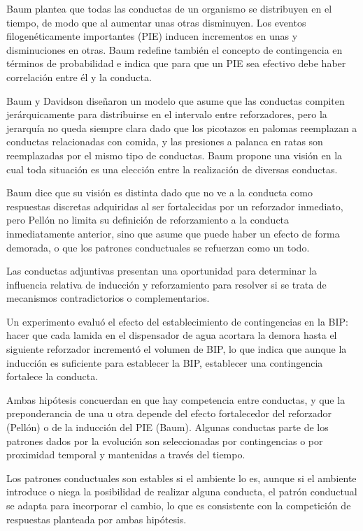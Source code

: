 \documentclass[a4paper,12pt]{article}
\begin{document}
Baum plantea que todas las conductas de un organismo se distribuyen en el tiempo, de modo que al aumentar unas otras disminuyen. Los eventos filogenéticamente importantes (PIE) inducen incrementos en unas y disminuciones en otras. Baum redefine también el concepto de contingencia en términos de probabilidad e indica que para que un PIE sea efectivo debe haber correlación entre él y la conducta.

Baum y Davidson diseñaron un modelo que asume que las conductas compiten jerárquicamente para distribuirse en el intervalo entre reforzadores, pero la jerarquía no queda siempre clara dado que los picotazos en palomas reemplazan a conductas relacionadas con comida, y las presiones a palanca en ratas son reemplazadas por el mismo tipo de conductas. Baum propone una visión en la cual toda situación es una elección entre la realización de diversas conductas.

Baum dice que su visión es distinta dado que no ve a la conducta como respuestas discretas adquiridas al ser fortalecidas por un reforzador inmediato, pero Pellón no limita su definición de reforzamiento a la conducta inmediatamente anterior, sino que asume que puede haber un efecto de forma demorada, o que los patrones conductuales se refuerzan como un todo.

Las conductas adjuntivas presentan una oportunidad para determinar la influencia relativa de inducción y reforzamiento para resolver si se trata de mecanismos contradictorios o complementarios.

Un experimento evaluó el efecto del establecimiento de contingencias en la BIP: hacer que cada lamida en el dispensador de agua acortara la demora hasta el siguiente reforzador incrementó el volumen de BIP, lo que indica que aunque la inducción es suficiente para establecer la BIP, establecer una contingencia fortalece la conducta.

Ambas hipótesis concuerdan en que hay competencia entre conductas, y que la preponderancia de una u otra depende del efecto fortalecedor del reforzador (Pellón) o de la inducción del PIE (Baum). Algunas conductas parte de los patrones dados por la evolución son seleccionadas por contingencias o por proximidad temporal y mantenidas a través del tiempo.

Los patrones conductuales son estables si el ambiente lo es, aunque si el ambiente introduce o niega la posibilidad de realizar alguna conducta, el patrón conductual se adapta para incorporar el cambio, lo que es consistente con la competición de respuestas planteada por ambas hipótesis.
\end{document}
